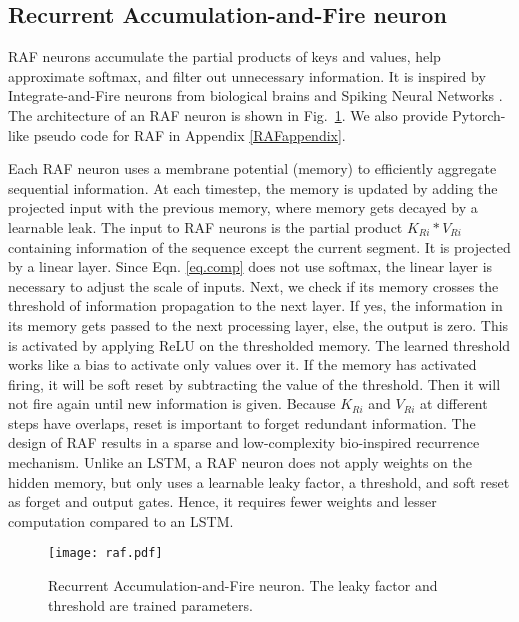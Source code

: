 \documentclass[11pt]{article}
\begin{document}
\subsection{Recurrent Accumulation-and-Fire neuron}
\label{RAFsection}
RAF neurons accumulate the partial products of keys and values, help approximate softmax, and filter out unnecessary information. It is inspired by Integrate-and-Fire neurons from biological brains and Spiking Neural Networks \citep{ deepsnn,biosnn, Ponghiran2021SpikingNN, onestep-SNN}. The architecture of an RAF neuron is shown in Fig.~\ref{fig:raf}. We also provide Pytorch-like pseudo code for RAF in Appendix \ref{RAFappendix}.

 Each RAF neuron uses a membrane potential (memory) to efficiently aggregate sequential information.  At each timestep, the memory is updated by adding the projected input with the previous memory, where memory gets decayed by a learnable leak. The input to RAF neurons is the partial product $K_{Ri}*V_{Ri}$ containing information of the sequence except the current segment. It is projected by a linear layer. Since Eqn. \ref{eq.comp} does not use softmax, the linear layer is necessary to adjust the scale of inputs. Next, we check if its memory crosses the threshold of information propagation to the next layer. If yes, the information in its memory gets passed to the next processing layer, else, the output is zero. This is activated by applying ReLU on the thresholded memory. The learned threshold works like a bias to activate only values over it. If the memory has activated firing, it will be soft reset by subtracting the value of the threshold. Then it will not fire again until new information is given. Because $K_{Ri}$ and $V_{Ri}$ at different steps have overlaps, reset is important to forget redundant information. The design of RAF results in a sparse and low-complexity bio-inspired recurrence mechanism. Unlike an LSTM, a RAF neuron does not apply weights on the hidden memory, but only uses a learnable leaky factor, a threshold, and soft reset as forget and output gates. Hence, it requires fewer weights and lesser computation compared to an LSTM. 



\begin{figure}
    \centering
    \texttt{[image: raf.pdf]}
    \caption{Recurrent Accumulation-and-Fire neuron. The leaky factor and threshold are trained parameters.}
    \label{fig:raf}
\end{figure}
\end{document}

